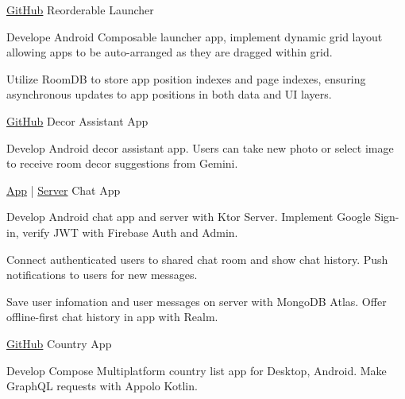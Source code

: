 \begin{cventries}

    \cventry
    {\href{https://github.com/neronguyenvn/Reorderable-Launcher}{GitHub}}
    {Reorderable Launcher}
    {}{}
    {
        \begin{cvitems}
            \item {
                Develope Android Composable launcher app, implement dynamic grid layout allowing apps to be auto-arranged as they are dragged within grid.
            }
            \item {
                Utilize RoomDB to store app position indexes and page indexes, ensuring asynchronous updates to app positions in both data and UI layers.
            }
        \end{cvitems}
    }

    \cventry
    {\href{https://github.com/neronguyenvn/decor-assistant-app}{GitHub}}
    {Decor Assistant App}
    {}{}
    {
        \begin{cvitems}
            \item {
                Develop Android decor assistant app.
                Users can take new photo or select image to receive room decor suggestions from Gemini.
            }
        \end{cvitems}
    }

    \cventry
    {\href{https://github.com/neronguyenvn/firebase-auth-chat-app}{App} | \href{https://github.com/neronguyenvn/firebase-auth-chat-server}{Server}}
    {Chat App}
    {}{}
    {
        \begin{cvitems}
            \item {
                Develop Android chat app and server with Ktor Server.
                Implement Google Sign-in, verify JWT with Firebase Auth and Admin.
            }
            \item {
                Connect authenticated users to shared chat room and show chat history.
                Push notifications to users for new messages.
            }
            \item {
                Save user infomation and user messages on server with MongoDB Atlas.
                Offer offline-first chat history in app with Realm.
            }
        \end{cvitems}
    }

    \cventry
    {\href{https://github.com/neronguyenvn/kmp-graphql-country-app}{GitHub}}
    {Country App}
    {}{}
    {
        \begin{cvitems}
            \item {
                Develop Compose Multiplatform country list app for Desktop, Android.
                Make GraphQL requests with Appolo Kotlin.
            }
        \end{cvitems}
    }


\end{cventries}
